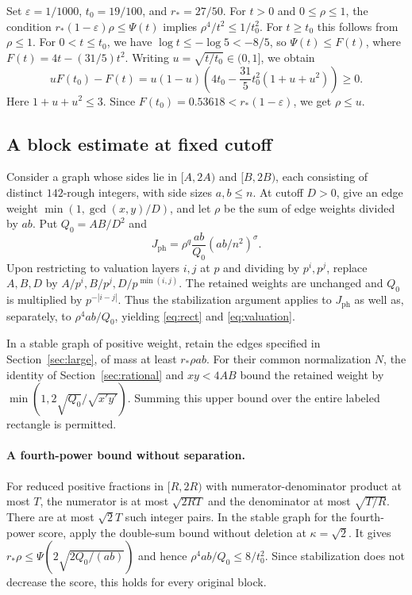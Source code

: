 \documentclass[11pt,a4paper]{article}
\begin{document}
Set \(\varepsilon=1/1000\), \(t_0=19/100\), and \(r_*=27/50\).
For \(t>0\) and \(0\le\rho\le1\), the condition
\(r_*(1-\varepsilon)\rho\le\Psi(t)\) implies
\(\rho^4/t^2\le1/t_0^2\). For \(t\ge t_0\) this follows from
\(\rho\le1\). For \(0<t\le t_0\), we have
\(\log t\le-\log5<-8/5\), so \(\Psi(t)\le F(t)\), where
\(F(t)=4t-(31/5)t^2\).
Writing \(u=\sqrt{t/t_0}\in(0,1]\), we obtain
\[
 uF(t_0)-F(t)
 =u(1-u)\left(4t_0-\frac{31}{5}t_0^2(1+u+u^2)\right)\ge0 .
\]
Here \(1+u+u^2\le3\). Since \(F(t_0)=0.53618<r_*(1-\varepsilon)\),
we get \(\rho\le u\).

\subsection{A block estimate at fixed cutoff}

Consider a graph whose sides lie in \([A,2A)\) and \([B,2B)\),
each consisting of distinct \(142\)-rough integers, with side sizes
\(a,b\le n\). At cutoff \(D>0\), give an edge weight
\(\min(1,\gcd(x,y)/D)\), and let \(\rho\) be the sum of edge weights
divided by \(ab\). Put \(Q_0=AB/D^2\) and
\[
 J_{\mathrm{ph}}=\rho^q\frac{ab}{Q_0}(ab/n^2)^\sigma .
\]
Upon restricting to valuation layers \(i,j\) at \(p\) and dividing
by \(p^i,p^j\), replace \(A,B,D\) by
\(A/p^i,B/p^j,D/p^{\min(i,j)}\). The retained weights are unchanged
and \(Q_0\) is multiplied by \(p^{-|i-j|}\). Thus the stabilization
argument applies to \(J_{\mathrm{ph}}\) as well as, separately, to
\(\rho^4 ab/Q_0\), yielding \eqref{eq:rect} and \eqref{eq:valuation}.

In a stable graph of positive weight, retain the edges specified in
Section~\ref{sec:large}, of mass at least \(r_*\rho ab\).
For their common normalization \(N\), the identity of
Section~\ref{sec:rational} and \(xy<4AB\) bound the retained
weight by \(\min(1,2\sqrt{Q_0}/\sqrt{x'y'})\). Summing this upper
bound over the entire labeled rectangle is permitted.

\paragraph{A fourth-power bound without separation.}
For reduced positive fractions in \([R,2R)\) with
numerator-denominator product at most \(T\), the numerator is at
most \(\sqrt{2RT}\) and the denominator at most \(\sqrt{T/R}\).
There are at most \(\sqrt2 T\) such integer pairs.
In the stable graph for the fourth-power score, apply the
double-sum bound without deletion at \(\kappa=\sqrt2\). It gives
\(r_*\rho\le\Psi(2\sqrt{2Q_0/(ab)})\) and hence
\(\rho^4 ab/Q_0\le8/t_0^2\).
Since stabilization does not decrease the score, this holds
for every original block.
\end{document}
